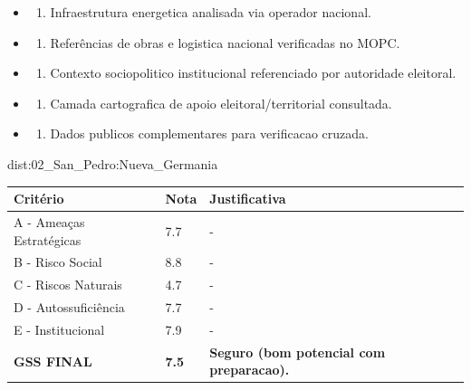 {\begin{itemize}
\item
  \begin{enumerate}
  \def\labelenumi{\arabic{enumi})}
  \setcounter{enumi}{7}
  \tightlist
  \item
    Infraestrutura energetica analisada via operador nacional.
  \end{enumerate}
\item
  \begin{enumerate}
  \def\labelenumi{\arabic{enumi})}
  \setcounter{enumi}{8}
  \tightlist
  \item
    Referências de obras e logistica nacional verificadas no MOPC.
  \end{enumerate}
\item
  \begin{enumerate}
  \def\labelenumi{\arabic{enumi})}
  \setcounter{enumi}{9}
  \tightlist
  \item
    Contexto sociopolitico institucional referenciado por autoridade
    eleitoral.
  \end{enumerate}
\item
  \begin{enumerate}
  \def\labelenumi{\arabic{enumi})}
  \setcounter{enumi}{10}
  \tightlist
  \item
    Camada cartografica de apoio eleitoral/\allowbreak territorial consultada.
  \end{enumerate}
\item
  \begin{enumerate}
  \def\labelenumi{\arabic{enumi})}
  \setcounter{enumi}{11}
  \tightlist
  \item
    Dados publicos complementares para verificacao cruzada.
  \end{enumerate}
\end{itemize}}{dist:02_San_Pedro:Nueva_Germania}
\begin{table}[ht!]
\small \begin{tabular}{p{3.0cm}p{0.8cm}p{6.0cm}} \toprule
\textbf{Critério} & \textbf{Nota} & \textbf{Justificativa} \\ \midrule
A - Ameaças Estratégicas & 7.7 & - \\
B - Risco Social & 8.8 & - \\
C - Riscos Naturais & 4.7 & - \\
D - Autossuficiência & 7.7 & - \\
E - Institucional & 7.9 & - \\
\midrule \textbf{GSS FINAL} & \textbf{7.5} & \textbf{Seguro (bom potencial com preparacao).} \\ \bottomrule \end{tabular}
\end{table}
